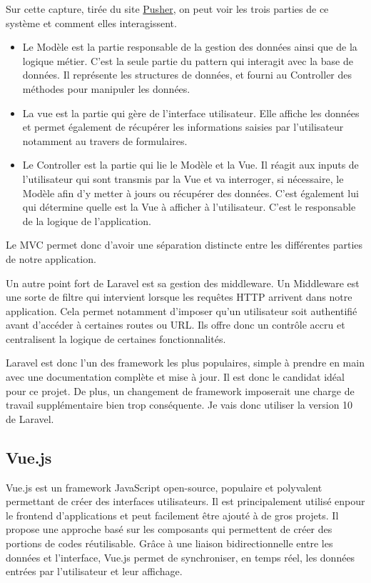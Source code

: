 Sur cette capture, tirée du site \href{https://pusher.com/blog/laravel-mvc-use/#what-is-mvc}{Pusher}, on peut voir les trois parties de ce système et comment elles interagissent.
\begin{itemize}
    \item Le Modèle est la partie responsable de la gestion des données ainsi que de la logique métier. C'est la seule partie du pattern qui interagit avec la base de données. Il représente les structures de données, et fourni au Controller des méthodes pour manipuler les données.
    \item La vue est la partie qui gère de l'interface utilisateur. Elle affiche les données et permet également de récupérer les informations saisies par l'utilisateur notamment au travers de formulaires.
    \item Le Controller est la partie qui lie le Modèle et la Vue. Il réagit aux inputs de l'utilisateur qui sont transmis par la Vue et va interroger, si nécessaire, le Modèle afin d'y metter à jours ou récupérer des données. C'est également lui qui détermine quelle est la Vue à afficher à l'utilisateur. C'est le responsable de la logique de l'application.
\end{itemize}
Le MVC permet donc d'avoir une séparation distincte entre les différentes parties de notre application.

Un autre point fort de Laravel est sa gestion des middleware. Un Middleware est une sorte de filtre qui intervient lorsque les requêtes HTTP arrivent dans notre application. Cela permet notamment d'imposer qu'un utilisateur soit authentifié avant d'accéder à certaines routes ou URL. Ils offre donc un contrôle accru et centralisent la logique de certaines fonctionnalités.

Laravel est donc l'un des framework les plus populaires, simple à prendre en main avec une documentation complète et mise à jour. Il est donc le candidat idéal pour ce projet. De plus, un changement de framework imposerait une charge de travail supplémentaire bien trop conséquente.
Je vais donc utiliser la version 10 de Laravel.

\subsection{Vue.js}
Vue.js est un framework JavaScript open-source, populaire et polyvalent permettant de créer des interfaces utilisateurs. Il est principalement utilisé enpour le frontend d'applications et peut facilement être ajouté à de gros projets. Il propose une approche basé sur les composants qui permettent de créer des portions de codes réutilisable. Grâce à une liaison bidirectionnelle entre les données et l'interface, Vue.js permet de synchroniser, en temps réel, les données entrées par l'utilisateur et leur affichage.

